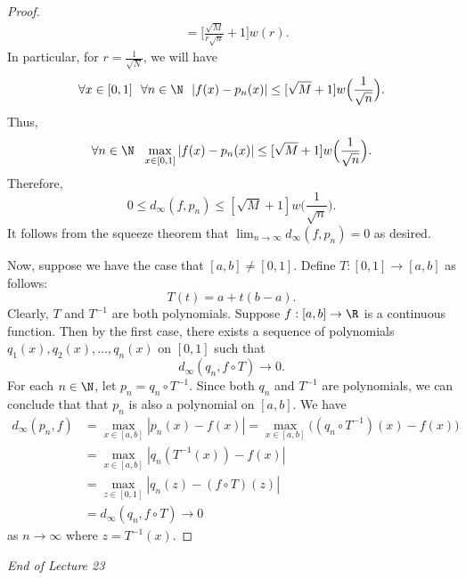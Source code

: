 \begin{proof}
\begin{align*}
                              &= \Big[ \frac{ \sqrt{ M }  }{ r \sqrt{ n }  }  + 1 \Big] w(r). 
    \end{align*}
    In particular, for \( r = \frac{ 1  }{ \sqrt{  N  }  }  \), we will have 
    \[  \forall x \in [0,1] \ \ \forall n \in \N \ \ | f(x) - {p}_{n}(x)  | \leq [\sqrt{  M  }  + 1 ] w \Big(  \frac{ 1 }{ \sqrt{ n }  }  \Big). \] 
    Thus, 
    \[  \forall n \in \N  \ \ \max_{x \in [0,1]} | f(x) - {p}_{n}(x)  |  \leq [\sqrt{ M  }  + 1 ] w  \Big(  \frac{ 1 }{ \sqrt{ n }  }  \Big). \]
    Therefore, 
    \[  0 \leq {d}_{\infty }(f, {p}_{n}) \leq [\sqrt{ M }  + 1] w \Big(  \frac{ 1 }{ \sqrt{ n }  }  \Big). \]
    It follows from the squeeze theorem that \( \lim_{ n \to \infty  }  {d}_{\infty }(f,{p}_{n}) = 0 \) as desired.

    Now, suppose we have the case that \( [a,b] \neq [0,1] \). Define \( T: [0,1] \to [a,b] \) as follows: 
    \[  T(t) = a + t(b-a). \]
    Clearly, \( T  \) and \( T^{-1} \) are both polynomials. Suppose \( f:[a,b] \to \R  \) is a continuous function. Then by the first case, there exists a sequence of polynomials \( {q}_{1}(x), {q}_{2}(x), \dots, {q}_{n}(x) \) on \( [0,1] \) such that 
    \[  {d}_{\infty }({q}_{n}, f \circ T) \to 0.   \]
    For each \( n \in \N  \), let \( {p}_{n} = {q}_{n} \circ T^{-1} \). Since both \( {q}_{n}  \) and \( T^{-1} \) are polynomials, we can conclude that that \( {p}_{n} \) is also a polynomial on \( [a,b] \). We have
    \begin{align*}
        {d}_{\infty }({p}_{n},f) &= \max_{x \in [a,b]} | {p}_{n}(x) - f(x)  |  = \max_{x \in [a,b]} \Big(  ({q}_{n} \circ T^{-1}) (x) - f(x) \Big) \\
                                 &= \max_{x \in [a,b]} | {q}_{n} (T^{-1}(x)) - f(x) |  \\
                                 &= \max_{z \in [0,1]} | {q}_{n}(z) - (f \circ T)(z)  |  \\
                                 &= {d}_{\infty }({q}_{n}, f \circ T) \to 0 
    \end{align*}
    as \( n \to \infty  \) where \( z = T^{-1}(x) \).
\end{proof}

\begin{center}
    \textit{End of Lecture 23} 
\end{center}
